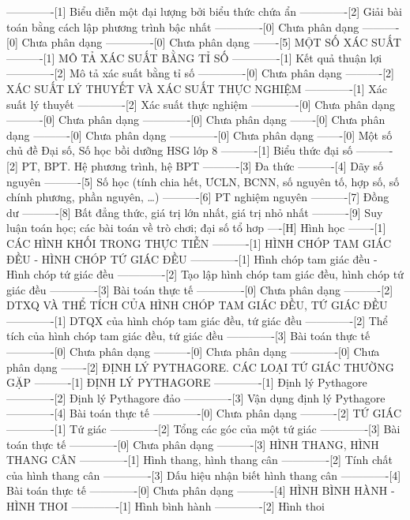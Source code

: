 -------------[1] Biểu diễn một đại lượng bởi biểu thức chứa ẩn
-------------[2] Giải bài toán bằng cách lập phương trình bậc nhất
-------------[0] Chưa phân dạng
----------[0] Chưa phân dạng
-------------[0] Chưa phân dạng
-------[5] MỘT SỐ XÁC SUẤT
----------[1] MÔ TẢ XÁC SUẤT BẰNG TỈ SỐ
-------------[1] Kết quả thuận lợi
-------------[2] Mô tả xác suất bằng tỉ số
-------------[0] Chưa phân dạng
----------[2] XÁC SUẤT LÝ THUYẾT VÀ XÁC SUẤT THỰC NGHIỆM
-------------[1] Xác suất lý thuyết
-------------[2] Xác suất thực nghiệm
-------------[0] Chưa phân dạng
----------[0] Chưa phân dạng
-------------[0] Chưa phân dạng
-------[0] Chưa phân dạng
----------[0] Chưa phân dạng
-------------[0] Chưa phân dạng
-------[0] Một số chủ đề Đại số, Số học bồi dưỡng HSG lớp 8
----------[1] Biểu thức đại số
----------[2] PT, BPT. Hệ phương trình, hệ BPT
----------[3] Đa thức
----------[4] Dãy số nguyên
----------[5] Số học (tính chia hết, ƯCLN, BCNN, số nguyên tố, hợp số, số chính phương, phần nguyên, \ldots)
----------[6] PT nghiệm nguyên
----------[7] Đồng dư
----------[8] Bất đẳng thức, giá trị lớn nhất, giá trị nhỏ nhất
----------[9] Suy luận toán học; các bài toán về trò chơi; đại số tổ hơp
----[H] Hình học
-------[1] CÁC HÌNH KHỐI TRONG THỰC TIỄN
----------[1] HÌNH CHÓP TAM GIÁC ĐỀU - HÌNH CHÓP TỨ GIÁC ĐỀU
-------------[1] Hình chóp tam giác đều - Hình chóp tứ giác đều
-------------[2] Tạo lập hình chóp tam giác đều, hình chóp tứ giác đều
-------------[3] Bài toán thực tế
-------------[0] Chưa phân dạng
----------[2] DTXQ VÀ THỂ TÍCH CỦA HÌNH CHÓP TAM GIÁC ĐỀU, TỨ GIÁC ĐỀU
-------------[1] DTQX của hình chóp tam giác đều, tứ giác đều
-------------[2] Thể tích của hình chóp tam giác đều, tứ giác đều
-------------[3] Bài toán thực tế
-------------[0] Chưa phân dạng
----------[0] Chưa phân dạng
-------------[0] Chưa phân dạng
-------[2] ĐỊNH LÝ PYTHAGORE. CÁC LOẠI TỨ GIÁC THƯỜNG GẶP
----------[1] ĐỊNH LÝ PYTHAGORE
-------------[1] Định lý Pythagore
-------------[2] Định lý Pythagore đảo
-------------[3] Vận dụng định lý Pythagore
-------------[4] Bài toán thực tế
-------------[0] Chưa phân dạng
----------[2] TỨ GIÁC
-------------[1] Tứ giác
-------------[2] Tổng các góc của một tứ giác
-------------[3] Bài toán thực tế
-------------[0] Chưa phân dạng
----------[3] HÌNH THANG, HÌNH THANG CÂN
-------------[1] Hình thang, hình thang cân
-------------[2] Tính chất của hình thang cân
-------------[3] Dấu hiệu nhận biết hình thang cân
-------------[4] Bài toán thực tế
-------------[0] Chưa phân dạng
----------[4] HÌNH BÌNH HÀNH - HÌNH THOI
-------------[1] Hình bình hành
-------------[2] Hình thoi
